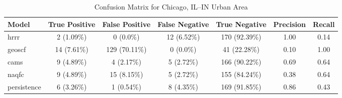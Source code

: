 \begin{table}[h!]
\centering
\begin{tabular}{lcccccc}
\hline
Model & True Positive & False Positive & False Negative & True Negative & Precision & Recall\\ \hline
hrrr & 2 (1.09\%) & 0 (0.0\%) & 12 (6.52\%) & 170 (92.39\%) & \cellcolor{green!25}1.00 & \cellcolor{red!25}0.14 \\ 
geoscf & 14 (7.61\%) & 129 (70.11\%) & 0 (0.0\%) & 41 (22.28\%) & \cellcolor{red!25}0.10 & \cellcolor{green!25}1.00 \\ 
cams & 9 (4.89\%) & 4 (2.17\%) & 5 (2.72\%) & 166 (90.22\%) & \cellcolor{red!25}0.69 & \cellcolor{green!25}0.64 \\ 
naqfc & 9 (4.89\%) & 15 (8.15\%) & 5 (2.72\%) & 155 (84.24\%) & \cellcolor{red!25}0.38 & \cellcolor{green!25}0.64 \\ 
persistence & 6 (3.26\%) & 1 (0.54\%) & 8 (4.35\%) & 169 (91.85\%) & 0.86 & 0.43 \\ 
\hline
\end{tabular}
\caption{Confusion Matrix for Chicago, IL--IN Urban Area}
\end{table}
